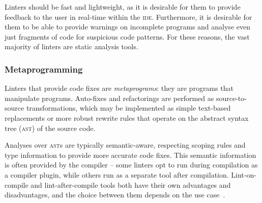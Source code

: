 \documentclass[../../main.tex]{subfiles}
\begin{document}
Linters should be fast and lightweight, as it is desirable for them to provide feedback to the user in real-time within the \textsc{ide}.
Furthermore, it is desirable for them to be able to provide warnings on incomplete programs and analyse even just fragments of code for suspicious code patterns.
For these reasons, the vast majority of linters are static analysis tools.




\subsubsection{Metaprogramming}
Linters that provide code fixes are \emph{metaprograms}: they are programs that manipulate programs.
Auto-fixes and refactorings are performed as source-to-source transformations, which may be implemented as simple text-based replacements or more robust rewrite rules that operate on the abstract syntax tree (\textsc{ast}) of the source code.

Analyses over \textsc{ast}s are typically semantic-aware, respecting scoping rules and type information to provide more accurate code fixes.
This semantic information is often provided by the compiler -- some linters opt to run during compilation as a compiler plugin, while others run as a separate tool after compilation.
Lint-on-compile and lint-after-compile tools both have their own advantages and disadvantages, and the choice between them depends on the use case~\cite{sadowski_analysis-google_2018}.
\end{document}
